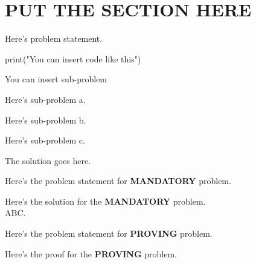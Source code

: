 \documentclass[a4paper, 10pt]{article}
\begin{document}
\subject[COURSE NAME]

\section{PUT THE SECTION HERE}

\begin{problem}
Here's problem statement.
\begin{codingbox}
    print("You can insert code like this")
\end{codingbox}
You can insert sub-problem
\begin{subproblems}
    \item Here's sub-problem a.
    \item Here's sub-problem b.
    \item Here's sub-problem c.
\end{subproblems}
\end{problem}

\begin{solution}
    The solution goes here.
\end{solution}

\begin{problem}
	Here's the problem statement for \textbf{MANDATORY} problem.
\end{problem}

\begin{tosubmit}
    Here's the solution for the \textbf{MANDATORY} problem. \\
    ABC.
\end{tosubmit}

\begin{problem}
	Here's the problem statement for \textbf{PROVING} problem.
\end{problem}

\begin{proofbox}
	Here's the proof for the \textbf{PROVING} problem.
\end{proofbox}
\end{document}
